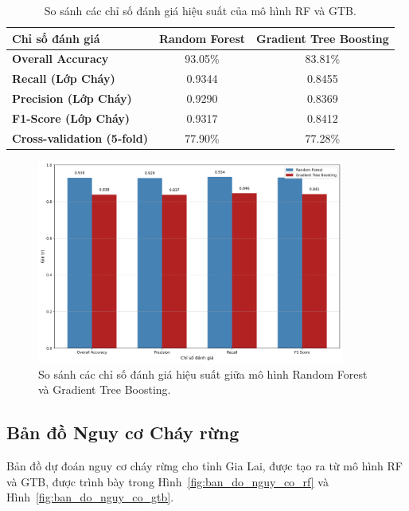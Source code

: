 \documentclass{article}
\begin{document}
\begin{table}[H]
\centering
\caption{So sánh các chỉ số đánh giá hiệu suất của mô hình RF và GTB.}
\label{tab:so_sanh_hieu_suat_rf_gtb}
\begin{tabular}{>{\bfseries}lcc}
\toprule
\textbf{Chỉ số đánh giá} & \textbf{Random Forest} & \textbf{Gradient Tree Boosting} \\
\midrule
Overall Accuracy        & 93.05\%       & 83.81\%                \\
Recall (Lớp Cháy)       & 0.9344        & 0.8455                 \\
Precision (Lớp Cháy)    & 0.9290        & 0.8369                 \\
F1-Score (Lớp Cháy)     & 0.9317        & 0.8412                 \\
Cross-validation (5-fold) & 77.90\% & 77.28\%       \\
\bottomrule
\end{tabular}
\end{table}

\begin{figure}[H]
\centering
\includegraphics[width=0.9\textwidth]{Model_Metrics.png}
\caption{So sánh các chỉ số đánh giá hiệu suất giữa mô hình Random Forest và Gradient Tree Boosting.}
\label{fig:so_sanh_hieu_suat_rf_gtb_bieu_do}
\end{figure}
\FloatBarrier

\subsection{Bản đồ Nguy cơ Cháy rừng} %
Bản đồ dự đoán nguy cơ cháy rừng cho tỉnh Gia Lai, được tạo ra từ mô hình RF và GTB, được trình bày trong Hình~\ref{fig:ban_do_nguy_co_rf} và Hình~\ref{fig:ban_do_nguy_co_gtb}.
\end{document}
